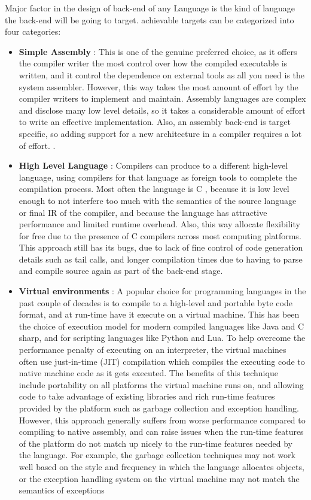\documentclass{book}
\begin{document}
	Major factor in the design of back-end of any Language is the kind of language the back-end will be going to target.
	achievable targets can be categorized into four categories:
	
	\begin{itemize}
		\item \textbf{Simple Assembly} :  This is one of the genuine preferred choice, as it offers the compiler
		writer the most control over how the compiled executable is written, and it control
		the dependence on external tools as all you need is the system assembler. However, this
		way takes the most amount of effort by the compiler writers to implement and
		maintain.  Assembly languages are complex and disclose many low level details, so
		it takes a considerable amount of effort to write an effective implementation.  Also,
		an assembly back-end is target specific, so adding support for a new architecture in a
		compiler requires a lot of effort.
		.
		\item \textbf{High Level Language} : Compilers can produce to a different high-level language, using
		compilers for that language as foreign tools to complete the compilation process.
		Most often the language is C ,  because it is low level enough to not interfere too much with the semantics of the source language or final IR of the compiler, and because the language has attractive performance and limited runtime overhead.  Also, this way allocate flexibility for free due to the presence of C compilers across most computing platforms. This approach still has its bugs, due to lack of fine control of	code generation details such as tail calls, and longer compilation times due to having	to parse and compile source again as part of the back-end stage. 
		\item \textbf{Virtual environments} : A popular choice for programming languages in the past couple of decades is to compile to a high-level and portable byte code format, and at run-time have it execute on a virtual machine. This has been the choice of execution model for modern compiled languages like Java and C sharp, and for  scripting  languages  like  Python  and  Lua.   To  help  overcome  the  performance penalty of executing on an interpreter,  the virtual machines often use just-in-time (JIT) compilation which compiles the executing code to native machine code as it gets executed. The benefits of this technique include portability on all platforms the virtual machine runs on, and allowing code to take advantage of existing libraries and rich run-time features provided by the platform such as garbage collection and exception handling.   However,  this approach generally suffers from worse performance compared to compiling to native assembly, and can raise issues when the run-time features of the platform do not match up nicely to the run-time features needed by the language.  For example, the garbage collection techniques may not work well based	on the style and frequency in which the language allocates objects, or the exception handling system on the virtual machine may not match the semantics of exceptions

\end{itemize}
\end{document}
